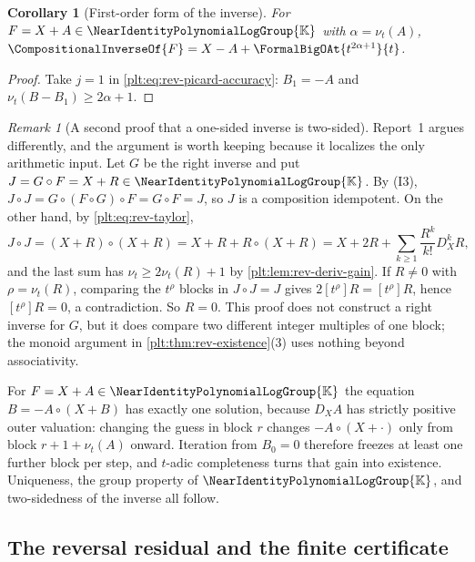 \documentclass[11pt,oneside]{article}
\theoremstyle{plain}
\newtheorem{corollary}[theorem]{Corollary}
\theoremstyle{definition}
\theoremstyle{remark}
\newtheorem{remark}[theorem]{Remark}
\newcommand{\K}{\mathbb{K}}
\newcommand{\Gnear}{\NearIdentityPolynomialLogGroup{\K}} %
\newcommand{\ordt}{\nu_{t}}                              %
\newcommand{\DX}{D_{X}}                                  %
\newcommand{\compose}{\mathbin{\circ}}
\newcommand{\rev}[1]{\CompositionalInverseOf{#1}}
\begin{document}
\begin{corollary}[First-order form of the inverse]
\label{plt:cor:rev-first-order}
For \(F=X+A\in\Gnear\) with \(\alpha=\ordt(A)\),
\(\rev{F}=X-A+\FormalBigOAt{t^{2\alpha+1}}{t}\).
\end{corollary}

\begin{proof}
Take \(j=1\) in \eqref{plt:eq:rev-picard-accuracy}: \(B_1=-A\) and
\(\ordt(B-B_1)\ge2\alpha+1\).
\end{proof}

\begin{remark}[A second proof that a one-sided inverse is two-sided]
\label{plt:rmk:rev-idempotent}
Report~1 argues differently, and the argument is worth keeping because it
localizes the only arithmetic input.  Let \(G\) be the right inverse and put
\(J=G\compose F=X+R\in\Gnear\).  By (I3),
\(J\compose J=G\compose(F\compose G)\compose F=G\compose F=J\), so \(J\) is a
composition idempotent.  On the other hand, by \eqref{plt:eq:rev-taylor},
\[
 J\compose J=(X+R)\compose(X+R)=X+R+R\compose(X+R)
 =X+2R+\sum_{k\ge1}\frac{R^k}{k!}\DX^kR ,
\]
and the last sum has \(\ordt\ge2\ordt(R)+1\) by
\cref{plt:lem:rev-deriv-gain}.  If \(R\ne0\) with \(\rho=\ordt(R)\), comparing
the \(t^\rho\) blocks in \(J\compose J=J\) gives \(2[t^\rho]R=[t^\rho]R\),
hence \([t^\rho]R=0\), a contradiction.  So \(R=0\).  This proof does not
construct a right inverse for \(G\), but it does compare two different integer
multiples of one block; the monoid argument in
\cref{plt:thm:rev-existence}(3) uses nothing beyond associativity.
\end{remark}

\begin{summarybox}
For \(F=X+A\in\Gnear\) the equation \(B=-A\compose(X+B)\) has exactly one
solution, because \(\DX A\) has strictly positive outer valuation: changing the
guess in block \(r\) changes \(-A\compose(X+\cdot)\) only from block
\(r+1+\ordt(A)\) onward.  Iteration from \(B_0=0\) therefore freezes at least
one further block per step, and \(t\)-adic completeness turns that gain into
existence.  Uniqueness, the group property of \(\Gnear\), and two-sidedness of
the inverse all follow.
\end{summarybox}

\subsection{The reversal residual and the finite certificate}
\label{plt:sec:rev-residual}
\end{document}
